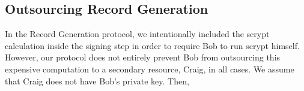\documentclass{sig-alternate}
\begin{document}

%

\subsection{Outsourcing Record Generation}

In the Record Generation protocol, we intentionally included the scrypt calculation inside the signing step in order to require Bob to run scrypt himself. However, our protocol does not entirely prevent Bob from outsourcing this expensive computation to a secondary resource, Craig, in all cases. We assume that Craig does not have Bob's private key. Then,
\end{document}
